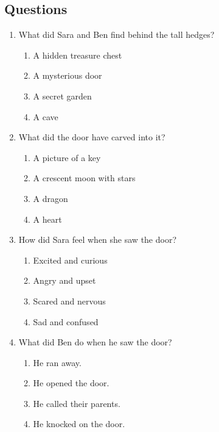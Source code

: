 \documentclass[12pt]{article}
\begin{document}
\subsection*{Questions}
\begin{enumerate}

    \item What did Sara and Ben find behind the tall hedges?
    \begin{enumerate}[label=\Alph*.]
        \item A hidden treasure chest
        \item A mysterious door
        \item A secret garden
        \item A cave
    \end{enumerate}

    \vspace{0.5cm}

    \item What did the door have carved into it?
    \begin{enumerate}[label=\Alph*.]
        \item A picture of a key
        \item A crescent moon with stars
        \item A dragon
        \item A heart
    \end{enumerate}

    \vspace{0.5cm}

    \item How did Sara feel when she saw the door?
    \begin{enumerate}[label=\Alph*.]
        \item Excited and curious
        \item Angry and upset
        \item Scared and nervous
        \item Sad and confused
    \end{enumerate}

    \vspace{0.5cm}

    \item What did Ben do when he saw the door?
    \begin{enumerate}[label=\Alph*.]
        \item He ran away.
        \item He opened the door.
        \item He called their parents.
        \item He knocked on the door.
    \end{enumerate}


\end{enumerate}
\end{document}
